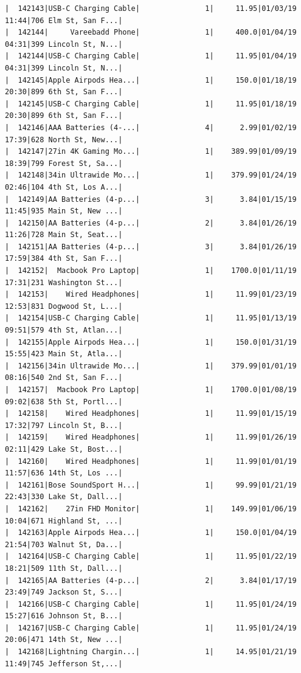 \documentclass[
  letterpaper,
  DIV=11,
  numbers=noendperiod]{scrartcl}
\begin{document}
\begin{verbatim}
|  142143|USB-C Charging Cable|               1|     11.95|01/03/19 11:44|706 Elm St, San F...|
|  142144|     Vareebadd Phone|               1|     400.0|01/04/19 04:31|399 Lincoln St, N...|
|  142144|USB-C Charging Cable|               1|     11.95|01/04/19 04:31|399 Lincoln St, N...|
|  142145|Apple Airpods Hea...|               1|     150.0|01/18/19 20:30|899 6th St, San F...|
|  142145|USB-C Charging Cable|               1|     11.95|01/18/19 20:30|899 6th St, San F...|
|  142146|AAA Batteries (4-...|               4|      2.99|01/02/19 17:39|628 North St, New...|
|  142147|27in 4K Gaming Mo...|               1|    389.99|01/09/19 18:39|799 Forest St, Sa...|
|  142148|34in Ultrawide Mo...|               1|    379.99|01/24/19 02:46|104 4th St, Los A...|
|  142149|AA Batteries (4-p...|               3|      3.84|01/15/19 11:45|935 Main St, New ...|
|  142150|AA Batteries (4-p...|               2|      3.84|01/26/19 11:26|728 Main St, Seat...|
|  142151|AA Batteries (4-p...|               3|      3.84|01/26/19 17:59|384 4th St, San F...|
|  142152|  Macbook Pro Laptop|               1|    1700.0|01/11/19 17:31|231 Washington St...|
|  142153|    Wired Headphones|               1|     11.99|01/23/19 12:53|831 Dogwood St, L...|
|  142154|USB-C Charging Cable|               1|     11.95|01/13/19 09:51|579 4th St, Atlan...|
|  142155|Apple Airpods Hea...|               1|     150.0|01/31/19 15:55|423 Main St, Atla...|
|  142156|34in Ultrawide Mo...|               1|    379.99|01/01/19 08:16|540 2nd St, San F...|
|  142157|  Macbook Pro Laptop|               1|    1700.0|01/08/19 09:02|638 5th St, Portl...|
|  142158|    Wired Headphones|               1|     11.99|01/15/19 17:32|797 Lincoln St, B...|
|  142159|    Wired Headphones|               1|     11.99|01/26/19 02:11|429 Lake St, Bost...|
|  142160|    Wired Headphones|               1|     11.99|01/01/19 11:57|636 14th St, Los ...|
|  142161|Bose SoundSport H...|               1|     99.99|01/21/19 22:43|330 Lake St, Dall...|
|  142162|    27in FHD Monitor|               1|    149.99|01/06/19 10:04|671 Highland St, ...|
|  142163|Apple Airpods Hea...|               1|     150.0|01/04/19 21:54|703 Walnut St, Da...|
|  142164|USB-C Charging Cable|               1|     11.95|01/22/19 18:21|509 11th St, Dall...|
|  142165|AA Batteries (4-p...|               2|      3.84|01/17/19 23:49|749 Jackson St, S...|
|  142166|USB-C Charging Cable|               1|     11.95|01/24/19 15:27|616 Johnson St, B...|
|  142167|USB-C Charging Cable|               1|     11.95|01/24/19 20:06|471 14th St, New ...|
|  142168|Lightning Chargin...|               1|     14.95|01/21/19 11:49|745 Jefferson St,...|

\end{verbatim}
\end{document}

